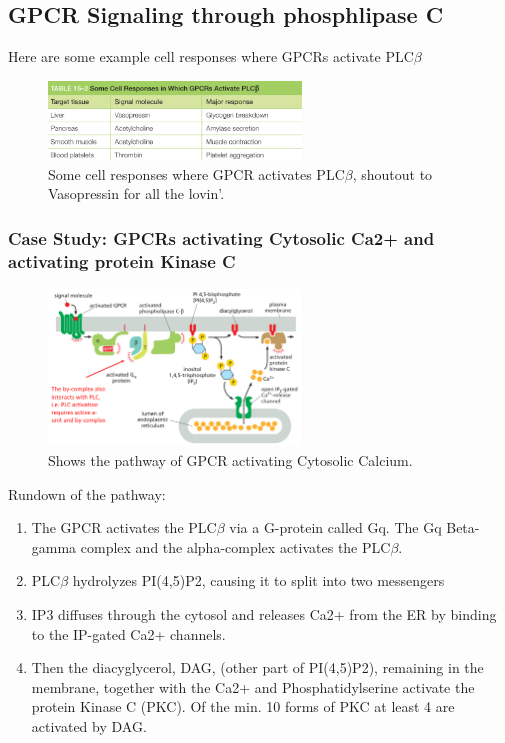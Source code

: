 \documentclass[../main.tex]{subfiles}
\begin{document}
\subsection{GPCR Signaling through phosphlipase C}
\label{sec:PLC}
Here are some example cell responses where GPCRs activate \gls{PLC}$\beta$
\begin{figure}[H]
	\centering
	\includegraphics[width=0.6\textwidth]{PLC_ex}
	\caption{Some cell responses where GPCR activates PLC$\beta$, shoutout to Vasopressin for all the lovin'.}
\end{figure}

\subsubsection{Case Study: GPCRs activating Cytosolic Ca2+ and activating protein Kinase C}
\begin{figure}[H]
	\centering
	\includegraphics[width=0.6\textwidth]{PLC_Ca}
	\caption{Shows the pathway of GPCR activating Cytosolic \gls{Calcium}.}
\end{figure}
Rundown of the pathway:
\begin{enumerate}
	\item The GPCR activates the PLC$\beta$ via a G-protein called \gls{Gq}. The Gq Beta-gamma complex and the alpha-complex activates the PLC$\beta$. 
	\item PLC$\beta$ hydrolyzes \gls{PI}(4,5)P2, causing it to split into two messengers
	\item IP3 diffuses through the cytosol and releases Ca2+ from the ER by binding to the IP-gated Ca2+ channels.
	\item Then the diacyglycerol, \gls{DAG}, (other part of PI(4,5)P2), remaining in the membrane, together with the Ca2+ and \gls{Phosphatidylserine} activate the protein Kinase C (\gls{PKC}). Of the min. 10 forms of PKC at least 4 are activated by DAG.
\end{enumerate}
\end{document}
